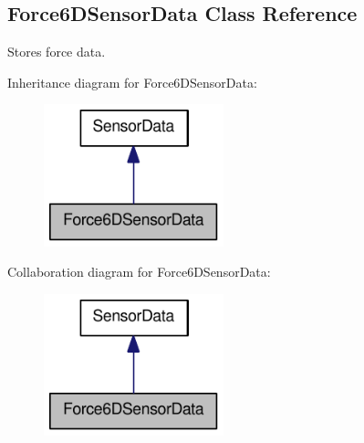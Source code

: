 \hypertarget{classOpenRAVE_1_1SensorBase_1_1Force6DSensorData}{
\subsection{Force6DSensorData Class Reference}
\label{classOpenRAVE_1_1SensorBase_1_1Force6DSensorData}
}


Stores force data.  




Inheritance diagram for Force6DSensorData:\nopagebreak
\begin{figure}[H]
\begin{center}
\leavevmode
\includegraphics[width=148pt]{classOpenRAVE_1_1SensorBase_1_1Force6DSensorData__inherit__graph}
\end{center}
\end{figure}


Collaboration diagram for Force6DSensorData:\nopagebreak
\begin{figure}[H]
\begin{center}
\leavevmode
\includegraphics[width=148pt]{classOpenRAVE_1_1SensorBase_1_1Force6DSensorData__coll__graph}
\end{center}
\end{figure}
